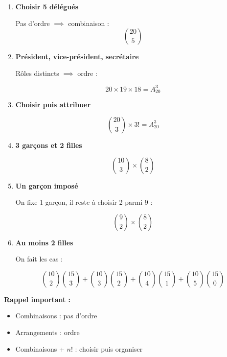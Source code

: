 \documentclass[12pt]{article}
\begin{document}
\begin{enumerate}[label=\textbf{Exercice \arabic*.}]
\[
4 \times 5 \times 5^3 = 4 \times 5^4 = 2500
\]

\vspace{0.3cm}

\item \textbf{Choisir 5 délégués}

Pas d’ordre $\implies$ combinaison :
\[
\binom{20}{5}
\]

\vspace{0.3cm}

\item \textbf{Président, vice-président, secrétaire}

Rôles distincts $\implies$ ordre :

\[
20 \times 19 \times 18 = A_{20}^3
\]

\vspace{0.3cm}

\item \textbf{Choisir puis attribuer}

\[
\binom{20}{3} \times 3! = A_{20}^3
\]

\vspace{0.3cm}

\item \textbf{3 garçons et 2 filles}

\[
\binom{10}{3} \times \binom{8}{2}
\]

\vspace{0.3cm}

\item \textbf{Un garçon imposé}

On fixe 1 garçon, il reste à choisir 2 parmi 9 :

\[
\binom{9}{2} \times \binom{8}{2}
\]

\vspace{0.3cm}

\item \textbf{Au moins 2 filles}

On fait les cas :

\[
\binom{10}{2}\binom{15}{3}
+ \binom{10}{3}\binom{15}{2}
+ \binom{10}{4}\binom{15}{1}
+ \binom{10}{5}\binom{15}{0}
\]

\end{enumerate}

\vspace{0.5cm}

\textbf{Rappel important :}

\begin{itemize}
    \item Combinaisons : pas d’ordre
    \item Arrangements : ordre
    \item Combinaisons + $n!$ : choisir puis organiser
\end{itemize}
\end{document}
